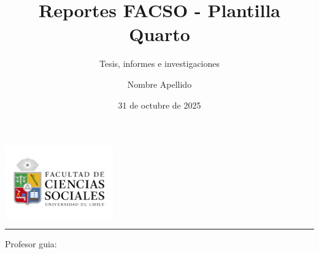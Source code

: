 \documentclass[
  spanish,
  a4paper,
  oneside]{scrbook}
\title{Reportes FACSO - Plantilla Quarto}
\subtitle{Tesis, informes e investigaciones}
\author{Nombre Apellido}
\date{31 de octubre de 2025}
\makeatletter
\providecommand{\subtitle}[1]{\gdef\@subtitle{#1}}
\providecommand{\@subtitle}{}
\providecommand{\subtitle}[1]{%
  \apptocmd{\@title}{\par {\large #1 \par}}{}{}
}
\makeatother
\begin{document}
\frontmatter
\maketitle

\makeatletter
\providecommand{\subtitle}[1]{\gdef\@subtitle{#1}}
\providecommand{\@subtitle}{}
\providecommand{\frontmattercontext}{}
\providecommand{\advisorname}{}
\providecommand{\advisorlabel}{Profesor guia:}
\providecommand{\frontmatterlocation}{}

\newcommand{\PrintTitle}{%
  {\sffamily\bfseries\fontsize{24pt}{28pt}\selectfont \@title\par}%
}
\newcommand{\PrintSubtitle}{%
  \begingroup
  \edef\temp{\detokenize{\@subtitle}}%
  \ifx\temp\empty\relax
  \else
    {\sffamily\bfseries\large \@subtitle\par}%
  \fi
  \endgroup
}
\newcommand{\PrintAuthor}{%
  {\Large\bfseries \@author\par}%
}
\newcommand{\PrintDate}{%
  {\small \@date\par}%
}
\makeatother

\begin{titlepage}
\thispagestyle{empty}
\begin{center}
\vspace*{10mm}

\includegraphics[width=0.35\textwidth]{assets/cover.png}\par
\vspace{12mm}

\PrintTitle
\vspace{6mm}
\PrintSubtitle

\vspace{22mm}
\begingroup
\edef\temp{\detokenize{\frontmattercontext}}%
\ifx\temp\empty\relax
\else
  {\normalsize \frontmattercontext\par}
\fi
\endgroup

\vspace{18mm}
\PrintAuthor

\vspace{16mm}
\begingroup
\edef\temp{\detokenize{\advisorname}}%
\ifx\temp\empty\relax
\else
  \rule{0.45\textwidth}{0.4pt}\par
  {\small \advisorlabel\ \advisorname\par}
\fi
\endgroup

\vfill
\begingroup
\edef\temp{\detokenize{\frontmatterlocation}}%
\ifx\temp\empty\relax
\else
  {\small \frontmatterlocation\par}
\fi
\endgroup
\PrintDate

\end{center}
\end{titlepage}
\end{document}
